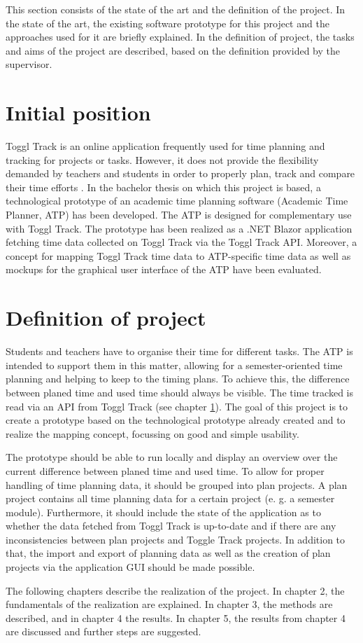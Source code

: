 
This section consists of the state of the art and the definition of the project. In the state of the art, the existing software prototype for this project and the approaches used for it are briefly explained. In the definition of project, the tasks and aims of the project are described, based on the definition provided by the supervisor.

\section{Initial position} \label{Initial position}
Toggl Track \cite{toggl_track_url} is an online application frequently used for time planning and tracking for projects or tasks. However, it does not provide the flexibility demanded by teachers and students in order to properly plan, track and compare their time efforts \cite{bachelorarbeit_Egger_Verstappen_page2}. In the bachelor thesis \cite{bachelorarbeit_Egger_Verstappen_page1} on which this project is based, a technological prototype of an academic time planning software (Academic Time Planner, ATP) has been developed. The ATP is designed for complementary use with Toggl Track. The prototype has been realized as a .NET Blazor application fetching time data collected on Toggl Track via the Toggl Track API. Moreover, a concept for mapping Toggl Track time data to ATP-specific time data as well as mockups for the graphical user interface of the ATP have been evaluated.

\section{Definition of project}
Students and teachers have to organise their time for different tasks. The ATP is intended to support them in this matter, allowing for a semester-oriented time planning and helping to keep to the timing plans. To achieve this, the difference between planed time and used time should always be visible. The time tracked is read via an API from Toggl Track (see chapter \ref{Initial position}). The goal of this project is to create a prototype based on the technological prototype already created and to realize the mapping concept, focussing on good and simple usability.

The prototype should be able to run locally and display an overview over the current difference between planed time and used time. To allow for proper handling of time planning data, it should be grouped into plan projects. A plan project contains all time planning data for a certain project (e. g. a semester module). Furthermore, it should include the state of the application as to whether the data fetched from Toggl Track is up-to-date and if there are any inconsistencies between plan projects and Toggle Track projects. In addition to that, the import and export of planning data as well as the creation of plan projects via the application GUI should be made possible.

The following chapters describe the realization of the project. In chapter 2, the fundamentals of the realization are explained. In chapter 3, the methods are described, and in chapter 4 the results. In chapter 5, the results from chapter 4 are discussed and further steps are suggested.
 


